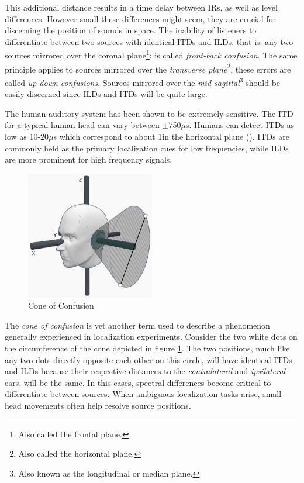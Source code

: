 This additional distance results in a time delay between IRs, as well as level differences. However small these differences might seem, they are crucial for discerning the position of sounds in space. The inability of listeners to differentiate between two sources with identical ITDs and ILDs, that is: any two sources mirrored over the coronal plane\footnote{Also called the frontal plane.}; is called \textit{front-back confusion}. The same principle applies to sources mirrored over the \textit{transverse plane}\footnote{Also called the horizontal plane.}, these errors are called \textit{up-down confusions}. Sources mirrored over the \textit{mid-sagittal}\footnote{Also known as the longitudinal or median plane.} should be easily discerned since ILDs and ITDs will be quite large.  

The human auditory system has been shown to be extremely sensitive. The ITD for a typical human head can vary between $\pm$750$\mu$s. Humans can detect ITDs as low as 10-20$\mu$s which correspond to about 1\textdegree in the horizontal plane (\cite{hacihabiboglu2017perceptual}). ITDs are commonly held as the primary localization cues for low frequencies, while ILDs are more prominent for high frequency signals. 

\begin{figure}[ht!]%
\centering
\includegraphics[width=0.5\textwidth]{img/cone_confusion.JPG}
\caption{Cone of Confusion}
\label{fig:cone-confusion}
\end{figure}

The \textit{cone of confusion} is yet another term used to describe a phenomenon generally experienced in localization experiments. Consider the two white dots on the circumference of the cone depicted in figure \ref{fig:cone-confusion}. The two positions, much like any two dots directly opposite each other on this circle, will have identical ITDs and ILDs because their respective distances to the \textit{contralateral} and \textit{ipsilateral} ears, will be the same. In this cases, spectral differences become critical to differentiate between sources. When ambiguous localization tasks arise, small head movements often help resolve source positions.

